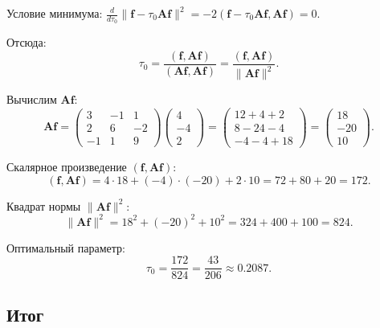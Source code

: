\documentclass{article}
\begin{document}
Условие минимума: $\frac{d}{d\tau_0}\|\mathbf{f} - \tau_0 \mathbf{A}\mathbf{f}\|^2 = -2(\mathbf{f} - \tau_0 \mathbf{A}\mathbf{f}, \mathbf{A}\mathbf{f}) = 0$.

Отсюда:
\begin{equation}
\tau_0 = \frac{(\mathbf{f}, \mathbf{A}\mathbf{f})}{(\mathbf{A}\mathbf{f}, \mathbf{A}\mathbf{f})} = \frac{(\mathbf{f}, \mathbf{A}\mathbf{f})}{\|\mathbf{A}\mathbf{f}\|^2}.
\end{equation}

Вычислим $\mathbf{A}\mathbf{f}$:
\begin{equation}
\mathbf{A}\mathbf{f} = \begin{pmatrix} 3 & -1 & 1 \\ 2 & 6 & -2 \\ -1 & 1 & 9 \end{pmatrix} \begin{pmatrix} 4 \\ -4 \\ 2 \end{pmatrix} = \begin{pmatrix} 12 + 4 + 2 \\ 8 - 24 - 4 \\ -4 - 4 + 18 \end{pmatrix} = \begin{pmatrix} 18 \\ -20 \\ 10 \end{pmatrix}.
\end{equation}

Скалярное произведение $(\mathbf{f}, \mathbf{A}\mathbf{f})$:
\begin{equation}
(\mathbf{f}, \mathbf{A}\mathbf{f}) = 4 \cdot 18 + (-4) \cdot (-20) + 2 \cdot 10 = 72 + 80 + 20 = 172.
\end{equation}

Квадрат нормы $\|\mathbf{A}\mathbf{f}\|^2$:
\begin{equation}
\|\mathbf{A}\mathbf{f}\|^2 = 18^2 + (-20)^2 + 10^2 = 324 + 400 + 100 = 824.
\end{equation}

Оптимальный параметр:
\begin{equation}
\boxed{\tau_0 = \frac{172}{824} = \frac{43}{206} \approx 0.2087.}
\end{equation}

\subsection*{Итог}
\end{document}
